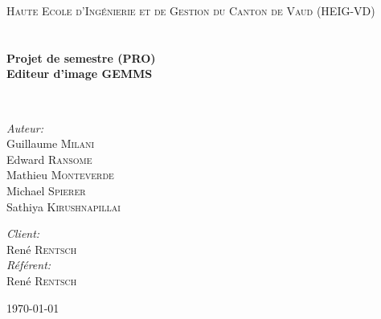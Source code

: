 \begin{titlepage}
    \begin{center}
        
        \textsc{\LARGE Haute Ecole d'Ingénierie et de Gestion du Canton de Vaud (HEIG-VD)}\\[1.5cm]
        
        \textsc{\Large }\\[0.5cm]
        
        \HRule \\[0.4cm]
        
        {\huge \bfseries Projet de semestre (PRO)\\
            Editeur d'image GEMMS \\[0.4cm] }
        
        \HRule \\[1.5cm]
        
        \begin{minipage}{0.4\textwidth}
            \begin{flushleft} \large
                \emph{Auteur:}\\
                Guillaume \textsc{Milani}\\
                Edward \textsc{Ransome}\\
                Mathieu \textsc{Monteverde}\\
                Michael \textsc{Spierer}\\
                Sathiya \textsc{Kirushnapillai}
            \end{flushleft}
        \end{minipage}
        \begin{minipage}{0.4\textwidth}
            \begin{flushright} \large
                \emph{Client:} \\
                René \textsc{Rentsch}\\
                \emph{Référent:} \\
                René \textsc{Rentsch}\\
            \end{flushright}
        \end{minipage}
        
        \vfill
        
        {\large \today}
        
    \end{center}
\end{titlepage}
